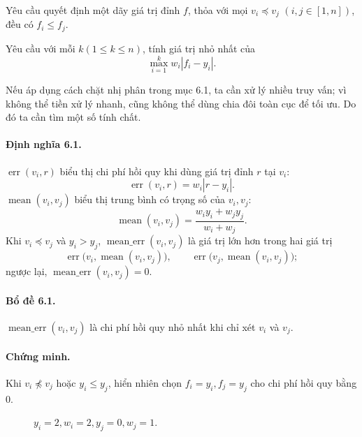 \documentclass[11pt]{article}
\begin{document}
Yêu cầu quyết định một dãy giá trị đỉnh \(f\), thỏa với mọi \(v_i\preceq v_j\)
\((i,j\in[1,n])\), đều có \(f_i\le f_j\).

Yêu cầu với mỗi \(k(1\le k\le n)\), tính giá trị nhỏ nhất của
\[
  \max_{i=1}^{k} w_i|f_i-y_i|.
\]

Nếu áp dụng cách chặt nhị phân trong mục 6.1, ta cần xử lý nhiều truy vấn; vì
không thể tiền xử lý nhanh, cũng không thể dùng chia đôi toàn cục để tối ưu. Do
đó ta cần tìm một số tính chất.

\paragraph{Định nghĩa 6.1.}
\(\operatorname{err}(v_i,r)\) biểu thị chi phí hồi quy khi dùng giá trị đỉnh
\(r\) tại \(v_i\):
\[
  \operatorname{err}(v_i,r)=w_i|r-y_i|.
\]
\(\operatorname{mean}(v_i,v_j)\) biểu thị trung bình có trọng số của
\(v_i,v_j\):
\[
  \operatorname{mean}(v_i,v_j)=\frac{w_iy_i+w_jy_j}{w_i+w_j}.
\]
Khi \(v_i\preceq v_j\) và \(y_i>y_j\),
\(\operatorname{mean\_err}(v_i,v_j)\) là giá trị lớn hơn trong hai giá trị
\[
  \operatorname{err}\bigl(v_i,\operatorname{mean}(v_i,v_j)\bigr),\qquad
  \operatorname{err}\bigl(v_j,\operatorname{mean}(v_i,v_j)\bigr);
\]
ngược lại, \(\operatorname{mean\_err}(v_i,v_j)=0\).

\paragraph{Bổ đề 6.1.}
\(\operatorname{mean\_err}(v_i,v_j)\) là chi phí hồi quy nhỏ nhất khi chỉ xét
\(v_i\) và \(v_j\).

\paragraph{Chứng minh.}
Khi \(v_i\not\preceq v_j\) hoặc \(y_i\le y_j\), hiển nhiên chọn
\(f_i=y_i,f_j=y_j\) cho chi phí hồi quy bằng \(0\).

\begin{figure}[ht]
\centering
{}
\caption{\(y_i=2,w_i=2,y_j=0,w_j=1\).}
\end{figure}
\end{document}
